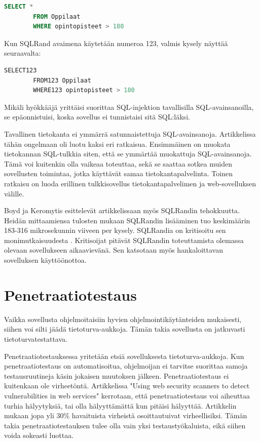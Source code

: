 \documentclass[finnish]{tktltiki2}
\theoremstyle{definition}
\theoremstyle{remark}
\begin{document}
		\begin{lstlisting}[language=sql]
		SELECT * 
		FROM Oppilaat
		WHERE opintopisteet > 180
		\end{lstlisting}
		Kun SQLRand avaimena käytetään numeroa 123, valmis kysely näyttää seuraavalta: 
		\begin{lstlisting}[language=sql]
		SELECT123
		FROM123 Oppilaat
		WHERE123 opintopisteet > 180
		\end{lstlisting}
		
	
	
	Mikäli hyökkääjä yrittäisi suorittaa SQL-injektion tavallisilla SQL-avainsanoilla, se epäonnistuisi, koska sovellus ei tunnistaisi sitä SQL:läksi.
	
	Tavallinen tietokanta ei ymmärrä satunnaistettuja SQL-avainsanoja. Artikkelissa tähän ongelmaan oli luotu kaksi eri ratkaisua. Ensimmäinen on muokata tietokannan SQL-tulkkia siten, että se ymmärtää muokattuja SQL-avainsanoja. Tämä voi kuitenkin olla vaikeaa toteuttaa, sekä se saattaa sotkea muiden sovellusten toimintaa, jotka käyttävät samaa tietokantapalvelinta. Toinen ratkaisu on luoda erillinen tulkkisovellus tietokantapalvelimen ja web-sovelluksen välille.
	
	Boyd ja Keromytis esittelevät artikkelissaan myös SQLRandin tehokkuutta. Heidän mittaamiensa tulosten mukaan SQLRandin lisääminen tuo keskimäärin 183-316 mikrosekunnin viiveen per kysely. SQLRandia on kritisoitu sen monimutkaisuudesta \cite{prepared}. Kritisoijat pitävät SQLRandin toteuttamista olemassa olevaan sovellukseen aikaavievänä. Sen katsotaan myös hankaloittavan sovelluksen käyttöönottoa.
	\section{Penetraatiotestaus}
	
	 Vaikka sovellusta ohjelmoitaisiin hyvien ohjelmointikäytänteiden mukaisesti, siihen voi silti jäädä tietoturva-aukkoja. Tämän takia sovellusta on jatkuvasti tietoturvatestattava. 
	 
	 Penetraatiotestauksessa yritetään etsiä sovelluksesta tietoturva-aukkoja. Kun penetraatiotestaus on automatisoitua, ohjelmoijan ei tarvitse suorittaa samoja testausruutineja käsin jokaisen muutoksen jälkeen. Penetraatiotestaus ei kuitenkaan ole virheetöntä. Artikkelissa "Using web security scanners to detect vulnerabilities in web services" \cite{detection} kerrotaan, että penetraatiotestaus voi aiheuttaa turhia hälyytyksiä, tai olla hälyyttämättä kun pitäisi hälyyttää. Artikkelin mukaan jopa yli 30\% havaituista virheistä osoittautuivat virheellisiksi. Tämän takia penetraatiotestauksen tulee olla vain yksi testaustyökaluista, eikä siihen voida sokeasti luottaa.
	 
\end{document}
